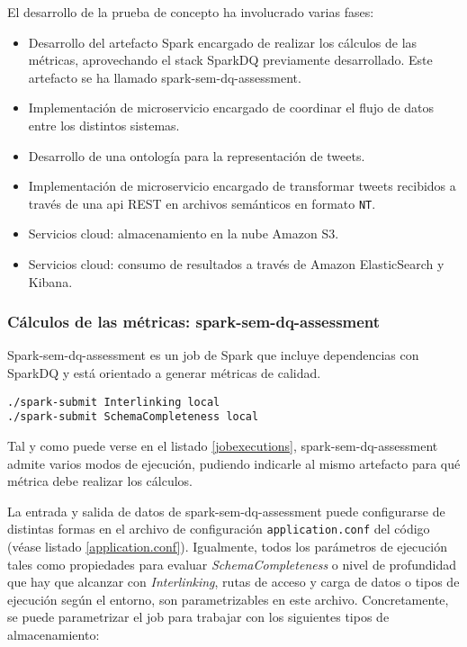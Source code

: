 El desarrollo de la prueba de concepto ha involucrado varias fases: 

\begin{itemize}
\item Desarrollo del artefacto Spark encargado de realizar los cálculos de las
  métricas, aprovechando el stack SparkDQ previamente desarrollado. Este
  artefacto se ha llamado spark-sem-dq-assessment. 
\item Implementación de microservicio encargado de coordinar el flujo de datos
  entre los distintos sistemas. 
\item Desarrollo de una ontología para la representación de tweets. 
\item Implementación de microservicio encargado de transformar tweets recibidos
 a través de una api REST en archivos semánticos en formato \texttt{NT}. 
\item Servicios cloud: almacenamiento en la nube Amazon S3. 
\item Servicios cloud: consumo de resultados a través de Amazon ElasticSearch y
  Kibana. 

\end{itemize}

\subsubsection{Cálculos de las métricas: spark-sem-dq-assessment}

Spark-sem-dq-assessment es un job de Spark que incluye dependencias con SparkDQ
y está orientado a generar métricas de calidad. 

\lstset{escapechar=@,language=bash}
\begin{lstlisting}[caption={Tipos de ejecución del job},captionpos=b,
    label=jobexecutions]
./spark-submit Interlinking local
./spark-submit SchemaCompleteness local
\end{lstlisting}

Tal y como puede verse en el listado \ref{jobexecutions},
spark-sem-dq-assessment admite varios modos de ejecución, pudiendo indicarle al
mismo artefacto para qué métrica debe realizar los cálculos. 

La entrada y salida de datos de spark-sem-dq-assessment puede configurarse
  de distintas formas en el archivo de configuración \texttt{application.conf}
  del código (véase listado \ref{application.conf}). Igualmente, todos los
  parámetros de ejecución tales como propiedades para evaluar
  \textit{SchemaCompleteness} o nivel de profundidad que hay que alcanzar con
  \textit{Interlinking}, rutas de acceso y carga de datos o tipos de ejecución
  según el entorno, son parametrizables en este archivo. Concretamente, se puede
  parametrizar el job para trabajar con los siguientes tipos de almacenamiento: 
 
